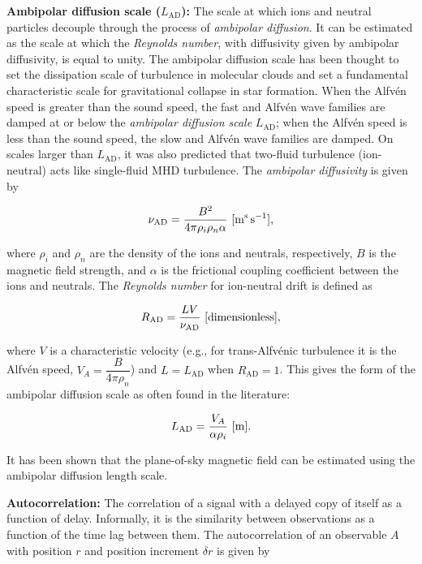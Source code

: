 \documentclass[a4paper,11pt]{article}
\begin{document}
{\noindent}\textbf{Ambipolar diffusion scale ($L_\mathrm{AD}$):} The scale at which ions and neutral particles decouple through the process of \textit{ambipolar diffusion}. It can be estimated as the scale at which the \textit{Reynolds number}, with diffusivity given by ambipolar diffusivity, is equal to unity. The ambipolar diffusion scale has been thought to set the dissipation scale of turbulence in molecular clouds and set a fundamental characteristic scale for gravitational collapse in star formation. When the Alfv\'en speed is greater than the sound speed, the fast and Alfv\'en wave families are damped at or below the \textit{ambipolar diffusion scale} $L_\mathrm{AD}$; when the Alfv\'en speed is less than the sound speed, the slow and Alfv\'en wave families are damped. On scales larger than $L_\mathrm{AD}$, it was also predicted that two-fluid turbulence (ion-neutral) acts like single-fluid MHD turbulence. The \textit{ambipolar diffusivity} is given by

\begin{align*}
    \nu_\mathrm{AD} = \frac{B^2}{4\pi\rho_i\rho_n\alpha} ~ [{\rm m^s\,s^{-1}}],
\end{align*}

{\noindent}where $\rho_i$ and $\rho_n$ are the density of the ions and neutrals, respectively, $B$ is the magnetic field strength, and $\alpha$ is the frictional coupling coefficient between the ions and neutrals. The \textit{Reynolds number} for ion-neutral drift is defined as

\begin{align*}
    R_\mathrm{AD} = \frac{LV}{\nu_\mathrm{AD}} ~ [{\rm dimensionless}],
\end{align*}

{\noindent}where $V$ is a characteristic velocity (e.g., for trans-Alfv\'enic turbulence it is the Alfv\'en speed, $V_A = \dfrac{B}{4\pi\rho_n}$) and $L=L_\mathrm{AD}$ when $R_\mathrm{AD}=1$. This gives the form of the ambipolar diffusion scale as often found in the literature:

\begin{align*}
    L_\mathrm{AD} = \frac{V_A}{\alpha\rho_i} ~ [{\rm m}].
\end{align*}

{\noindent}It has been shown that the plane-of-sky magnetic field can be estimated using the ambipolar diffusion length scale. 

{\noindent}\textbf{Autocorrelation:} The correlation of a signal with a delayed copy of itself as a function of delay. Informally, it is the similarity between observations as a function of the time lag between them. The autocorrelation of an observable $A$ with position $r$ and position increment $\delta r$ is given by
\end{document}
